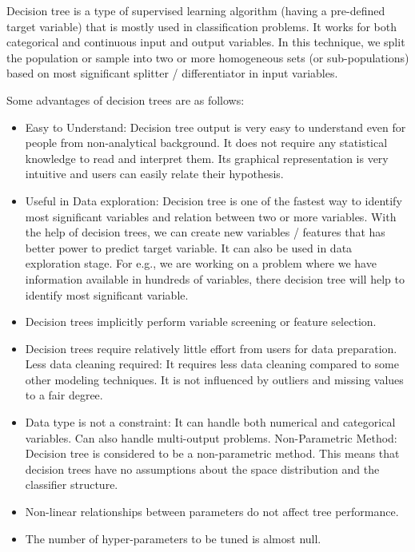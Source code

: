 \documentclass[12pt]{article}
\begin{document}
Decision tree is a type of supervised learning algorithm (having a pre-defined target variable) that is mostly used in classification problems. It works for both categorical and continuous input and output variables. In this technique, we split the population or sample into two or more homogeneous sets (or sub-populations) based on most significant splitter / differentiator in input variables.

Some advantages of decision trees are as follows:

\begin{itemize}
\item 
Easy to Understand: Decision tree output is very easy to understand even for people from non-analytical background. It does not require any statistical knowledge to read and interpret them. Its graphical representation is very intuitive and users can easily relate their hypothesis.

\item
Useful in Data exploration: Decision tree is one of the fastest way to identify most significant variables and relation between two or more variables. With the help of decision trees, we can create new variables / features that has better power to predict target variable. It can also be used in data exploration stage. For e.g., we are working on a problem where we have information available in hundreds of variables, there decision tree will help to identify most significant variable.

\item
Decision trees implicitly perform variable screening or feature selection.

\item
Decision trees require relatively little effort from users for data preparation.
Less data cleaning required: It requires less data cleaning compared to some other modeling techniques. It is not influenced by outliers and missing values to a fair degree.

\item
Data type is not a constraint: It can handle both numerical and categorical variables. Can also handle multi-output problems.
Non-Parametric Method: Decision tree is considered to be a non-parametric method. This means that decision trees have no assumptions about the space distribution and the classifier structure.

\item
Non-linear relationships between parameters do not affect tree performance.
\item
The number of hyper-parameters to be tuned is almost null.

\end{itemize}
\end{document}
